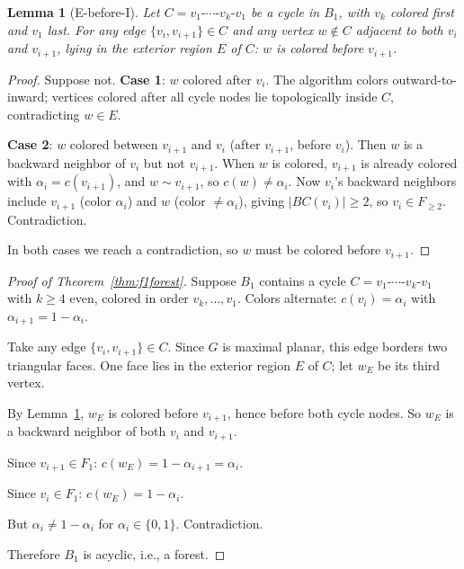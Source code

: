 \documentclass[11pt,twocolumn]{article}
\newtheorem{lemma}[theorem]{Lemma}
\begin{document}
\begin{lemma}[E-before-I]
\label{lem:ebeforei}
Let $C=v_1\text{-}\cdots\text{-}v_k\text{-}v_1$ be a cycle in $B_1$, with
$v_k$ colored first and $v_1$ last. For any edge $\{v_i,v_{i+1}\}\in C$ and
any vertex $w\notin C$ adjacent to both $v_i$ and $v_{i+1}$, lying in the
exterior region $E$ of $C$: $w$ is colored before $v_{i+1}$.
\end{lemma}

\begin{proof}
Suppose not. \textbf{Case 1}: $w$ colored after $v_i$. The algorithm colors
outward-to-inward; vertices colored after all cycle nodes lie topologically
inside $C$, contradicting $w\in E$.

\textbf{Case 2}: $w$ colored between $v_{i+1}$ and $v_i$ (after $v_{i+1}$,
before $v_i$). Then $w$ is a backward neighbor of $v_i$ but not $v_{i+1}$.
When $w$ is colored, $v_{i+1}$ is already colored with $\alpha_i=c(v_{i+1})$,
and $w\sim v_{i+1}$, so $c(w)\ne\alpha_i$. Now $v_i$'s backward neighbors
include $v_{i+1}$ (color $\alpha_i$) and $w$ (color $\ne\alpha_i$), giving
$|BC(v_i)|\geq 2$, so $v_i\in F_{\geq 2}$. Contradiction.

In both cases we reach a contradiction, so $w$ must be colored before
$v_{i+1}$.
\end{proof}

\begin{proof}[Proof of Theorem~\ref{thm:f1forest}]
Suppose $B_1$ contains a cycle $C=v_1\text{-}\cdots\text{-}v_k\text{-}v_1$
with $k\geq 4$ even, colored in order $v_k,\dots,v_1$. Colors alternate:
$c(v_i)=\alpha_i$ with $\alpha_{i+1}=1-\alpha_i$.

Take any edge $\{v_i,v_{i+1}\}\in C$. Since $G$ is maximal planar, this edge
borders two triangular faces. One face lies in the exterior region $E$ of $C$;
let $w_E$ be its third vertex.

By Lemma~\ref{lem:ebeforei}, $w_E$ is colored before $v_{i+1}$, hence before
both cycle nodes. So $w_E$ is a backward neighbor of both $v_i$ and $v_{i+1}$.

Since $v_{i+1}\in F_1$: $c(w_E)=1-\alpha_{i+1}=\alpha_i$.

Since $v_i\in F_1$: $c(w_E)=1-\alpha_i$.

But $\alpha_i\ne 1-\alpha_i$ for $\alpha_i\in\{0,1\}$. Contradiction.

Therefore $B_1$ is acyclic, i.e., a forest.
\end{proof}

\end{document}
